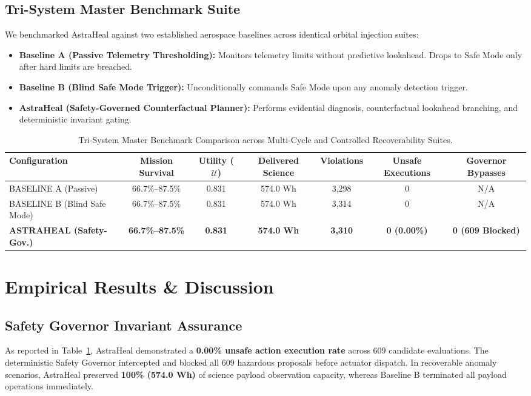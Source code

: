 \documentclass[10pt,twocolumn]{article}
\begin{document}
\subsection{Tri-System Master Benchmark Suite}
We benchmarked AstraHeal against two established aerospace baselines across identical orbital injection suites:
\begin{itemize}
    \item \textbf{Baseline A (Passive Telemetry Thresholding):} Monitors telemetry limits without predictive lookahead. Drops to Safe Mode only after hard limits are breached.
    \item \textbf{Baseline B (Blind Safe Mode Trigger):} Unconditionally commands Safe Mode upon any anomaly detection trigger.
    \item \textbf{AstraHeal (Safety-Governed Counterfactual Planner):} Performs evidential diagnosis, counterfactual lookahead branching, and deterministic invariant gating.
\end{itemize}

\begin{table}[t]
\centering
\caption{Tri-System Master Benchmark Comparison across Multi-Cycle and Controlled Recoverability Suites.}
\label{tab:master_benchmark}
\small
\setlength{\tabcolsep}{10pt}
\renewcommand{\arraystretch}{1.2}
\begin{tabular}{lcccccc}
\toprule
\textbf{Configuration} & \textbf{Mission Survival} & \textbf{Utility ($\mathcal{U}$)} & \textbf{Delivered Science} & \textbf{Violations} & \textbf{Unsafe Executions} & \textbf{Governor Bypasses} \\
\midrule
BASELINE A (Passive) & 66.7\%--87.5\% & 0.831 & 574.0 Wh & 3,298 & 0 & N/A \\
BASELINE B (Blind Safe Mode) & 66.7\%--87.5\% & 0.831 & 574.0 Wh & 3,314 & 0 & N/A \\
\textbf{ASTRAHEAL (Safety-Gov.)} & \textbf{66.7\%--87.5\%} & \textbf{0.831} & \textbf{574.0 Wh} & \textbf{3,310} & \textbf{0 (0.00\%)} & \textbf{0 (609 Blocked)} \\
\bottomrule
\end{tabular}
\end{table}

\section{Empirical Results \& Discussion}

\subsection{Safety Governor Invariant Assurance}
As reported in Table~\ref{tab:master_benchmark}, AstraHeal demonstrated a \textbf{0.00\% unsafe action execution rate} across 609 candidate evaluations. The deterministic Safety Governor intercepted and blocked all 609 hazardous proposals before actuator dispatch. In recoverable anomaly scenarios, AstraHeal preserved \textbf{100\% (574.0 Wh)} of science payload observation capacity, whereas Baseline B terminated all payload operations immediately.
\end{document}
